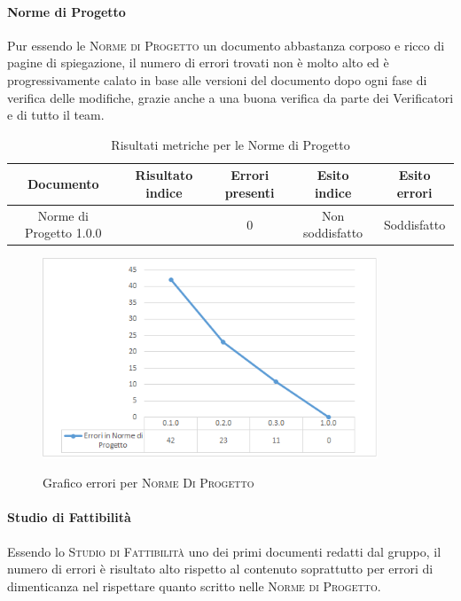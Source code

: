 \documentclass[../piano-di-qualifica.tex]{subfiles}
\begin{document}
\paragraph{Norme di Progetto}
\label{sub:norme_di_progetto}
Pur essendo le \textsc{Norme di Progetto} un documento abbastanza corposo e ricco di pagine di spiegazione, il numero di errori trovati non è molto alto ed è progressivamente calato in base alle versioni del documento dopo ogni fase di verifica delle modifiche, grazie anche a una buona verifica da parte dei Verificatori e di tutto il team.

\begin{table}[H]
    \centering
    \begin{tabular}{ccccc}
    \hline
    Documento                   & Risultato indice & Errori presenti & Esito indice    & Esito errori \\ \hline
    Norme di Progetto 1.0.0 &                  & 0               & Non soddisfatto & Soddisfatto 
    \end{tabular}
    \caption{Risultati metriche per le Norme di Progetto}
    \label{tab:my-table}
\end{table}

    \begin{figure}[H]
        \centering
        \includegraphics[width=10cm]{img/erroriNorme.png}
        \label{fig:scice_documenti}
        \caption{Grafico errori per \textsc{Norme Di Progetto}}
    \end{figure}

\paragraph{Studio di Fattibilità}
\label{sub:studio_di_fattibilita}
Essendo lo \textsc{Studio di Fattibilità} uno dei primi documenti redatti dal gruppo, il numero di errori è risultato alto rispetto al contenuto soprattutto per errori di dimenticanza nel rispettare quanto scritto nelle \textsc{Norme di Progetto}.
\end{document}
